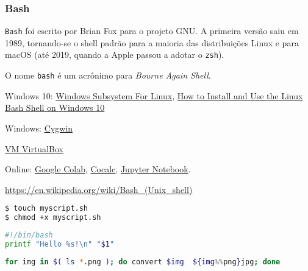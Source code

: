 \begin{frame}
\frametitle{Bash}
\texttt{Bash} foi escrito por Brian Fox para o projeto GNU. A primeira versão saiu em 1989, tornando-se o shell padrão 
para a maioria das distribuições Linux e para macOS (até 2019, quando a Apple passou a adotar o \texttt{zsh}).

\vspace{2ex}
O nome \texttt{bash} é um acrônimo para \emph{Bourne Again Shell}.


\vspace{2ex}
Windows 10: \href{https://blogs.windows.com/buildingapps/2016/03/30/run-bash-on-ubuntu-on-windows/}{Windows Subsystem For Linux},
\href{https://www.howtogeek.com/249966/how-to-install-and-use-the-linux-bash-shell-on-windows-10/}{How to Install and Use the Linux Bash Shell on Windows 10}

Windows: \href{https://www.cygwin.com/}{Cygwin}


\href{https://www.virtualbox.org/}{VM VirtualBox}

Online: 
\href{https://colab.research.google.com}{Google Colab},
\href{https://cocalc.com}{Cocalc},
\href{https://jupyter.org/}{Jupyter Notebook}.

\vspace{2ex}
\url{https://en.wikipedia.org/wiki/Bash_(Unix_shell)}


\framebreak

\begin{lstlisting}[language=bash, label=lst-bash-new-script-01, caption={Criando um script.}, postbreak=\mbox{$\hookrightarrow$\space}, basicstyle=\fontsize{8}{10}\selectfont\ttfamily]
$ touch myscript.sh
$ chmod +x myscript.sh
\end{lstlisting}

\begin{lstlisting}[language=bash, label=lst-bash-new-script-02, caption={Criando um script.}, postbreak=\mbox{$\hookrightarrow$\space}, basicstyle=\fontsize{8}{10}\selectfont\ttfamily]
#!/bin/bash
printf "Hello %s!\n" "$1"
\end{lstlisting}

\begin{lstlisting}[language=bash, label=lst-bash-convert-imgs, caption={Script para converter PNGs em JPGs}, postbreak=\mbox{$\hookrightarrow$\space}, basicstyle=\fontsize{8}{10}\selectfont\ttfamily]
for img in $( ls *.png ); do convert $img  ${img%%png}jpg; done
\end{lstlisting}


\end{frame}
